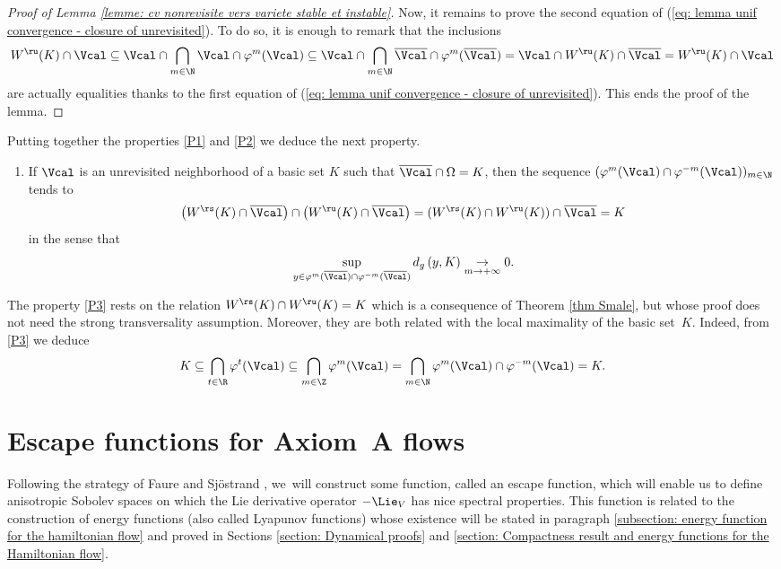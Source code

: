 \begin{proof}[Proof of Lemma \ref{lemme: cv nonrevisite vers variete stable et instable}]
Now, it remains to prove the second equation of (\ref{eq: lemma unif convergence - closure of unrevisited}). To do so, it is enough to remark that the inclusions
\[
W^\ru (K) \cap \Vcal \subseteq \Vcal \cap \bigcap_{m \in \N} \Vcal \cap \varphi^m (\Vcal) \subseteq \Vcal \cap \bigcap_{m \in \N} \overline{\Vcal} \cap \varphi^m (\overline{\Vcal}) =\Vcal \cap W^\ru (K) \cap \overline{\Vcal} = W^\ru (K) \cap \Vcal
\]
are actually equalities thanks to the first equation of (\ref{eq: lemma unif convergence - closure of unrevisited}). This ends the proof of the lemma.
\end{proof}

Putting together the properties \eqref{P1} and \eqref{P2} we deduce the next property.

\begin{enumerate}\renewcommand{\theenumi}{{P\arabic{enumi}}}\setcounter{enumi}{2}
\item\label{P3}
If $\Vcal$ is an unrevisited neighborhood of a basic set $K$ such that $\overline{\Vcal} \cap \Omega = K$, then the sequence $(\varphi^m (\Vcal) \cap \varphi^{-m} (\Vcal))_{m \in \N}$ tends to
\[
\left(W^\rs (K) \cap \overline{\Vcal} \right) \cap \left(W^\ru (K) \cap \overline{\Vcal} \right) = (W^\rs (K) \cap W^\ru (K))\cap \overline{\Vcal} = K
\]
in the sense that
\[
\sup_{y \in \varphi^m(\overline{\Vcal}) \cap \varphi^{-m} (\overline{\Vcal})} d_g \left(y, K \right) \underset{m \to + \infty}{\to} 0.
\]
\end{enumerate}

\begin{remark} The property \eqref{P3} rests on the relation $W^\rs (K) \cap W^\ru (K) = K$ which is a consequence of Theorem \ref{thm Smale}, but whose proof does not need the strong transversality assumption. Moreover, they are both related with the local maximality of the basic set~$K$. Indeed, from \eqref{P3} we deduce
\[
K \subseteq \bigcap_{t \in \R} \varphi^t (\Vcal) \subseteq \bigcap_{m \in \Z} \varphi^m (\Vcal) = \bigcap_{m \in \N} \varphi^m (\Vcal) \cap \varphi^{-m} (\Vcal) = K.
\]
\end{remark}

\section{Escape functions for Axiom~A flows}\label{section Escape function}

Following the strategy of Faure and Sjöstrand \cite{FS}, we~will construct some function, called an escape function, which will enable us to define anisotropic Sobolev spaces on which the Lie derivative operator $-\Lie_V$ has nice spectral properties. This function is related to the construction of energy functions (also called Lyapunov functions) whose existence will be stated in paragraph \ref{subsection: energy function for the hamiltonian flow} and proved in Sections \ref{section: Dynamical proofs} and \ref{section: Compactness result and energy functions for the Hamiltonian flow}.

